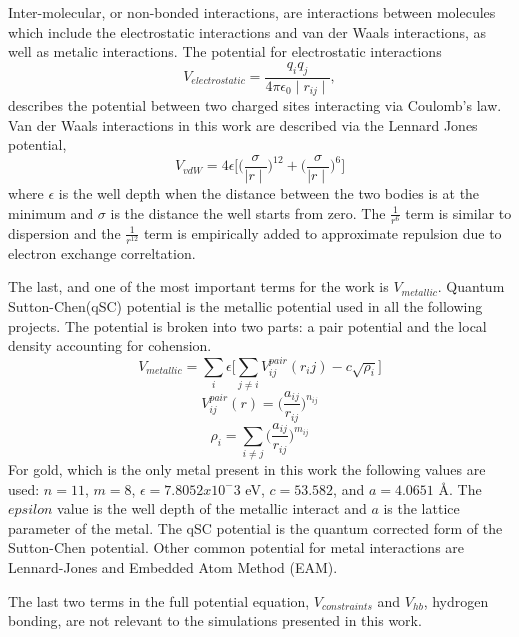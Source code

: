 Inter-molecular,  or non-bonded interactions, are interactions between molecules which include the electrostatic interactions and van der Waals interactions, as well as metalic interactions.
The potential for electrostatic interactions
\begin{equation}
    V_{electrostatic} = \frac{q_i q_j}{4 \pi \epsilon_0 \mid r_{ij}\mid},
\end{equation}
describes the potential between two charged sites interacting via Coulomb's law.
Van der Waals interactions in this work are described via the Lennard Jones potential,
\begin{equation}
    V_{vdW} = 4\epsilon\bigg[\bigg(\frac{\sigma}{\mid r\mid}\bigg)^{12} + \bigg(\frac{\sigma}{\mid r\mid}\bigg)^6\big]
\end{equation}
where $\epsilon$ is the well depth when the distance between the two bodies is at the minimum and $\sigma$ is the distance the well starts from zero. 
The $\frac{1}{r^6}$ term is similar to dispersion and the $\frac{1}{r^{12}}$ term is empirically added to approximate repulsion due to electron exchange correltation.

The last, and one of the most important terms for the work is $V_{metallic}$. Quantum Sutton-Chen(qSC) potential is the metallic potential used in all the following projects.\cite{Qi:1999ph} The potential is broken into two parts: a pair potential and the local density accounting for cohension.
\begin{equation}
    V_{metallic} = \sum_i \epsilon \Bigg[ \sum_{j \neq i} V_{ij}^{pair} (r_ij) - c\sqrt{\rho_i}\Bigg]
\end{equation}
\begin{equation}    
    V_{ij}^{pair} (r) = \bigg(\frac{a_{ij}}{r_{ij}}\bigg)^{n_{ij}}
\end{equation}
\begin{equation}
    \rho_i = \sum_{i \neq j}\bigg( \frac{a_{ij}}{r_{ij}}\bigg)^{m_{ij}}
\end{equation}
For gold, which is the only metal present in this work the following values are used: $n=11$, $m=8$, $\epsilon=7.8052 x 10^-3$ eV, $c=53.582$, and $a=4.0651$ \AA.
The $epsilon$ value is the well depth of the metallic interact and $a$ is the lattice parameter of the metal. 
The qSC potential is the quantum corrected form of the Sutton-Chen potential.
Other common potential for metal interactions are Lennard-Jones and Embedded Atom Method (EAM).\cite{EAM:1986}

The last two terms in the full potential equation, $V_{constraints}$ and $V_{hb}$, hydrogen bonding, are not relevant to the simulations presented in this work.

